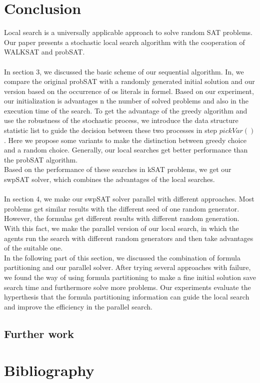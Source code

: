 \documentclass[12pt,a4paper,twoside]{scrartcl}
\numberwithin{equation}{section}
\begin{document}
\clearpage
\section{Conclusion}

\label{sec:conc}
Local search is a universally applicable approach to solve random SAT problems. Our paper presents a stochastic local search algorithm with the cooperation of WALKSAT and probSAT.\\
\\
In section 3, we discussed the basic scheme of our sequential algorithm. In, we compare the original probSAT with a randomly generated initial solution and our version based on the occurrence of os literals in formel. Based on our experiment, our initialization is advantages n the number of solved problems and also in the execution time of the search. To get the advantage of the greedy algorithm and use the robustness of the stochastic process, we introduce the data structure statistic list to guide the decision between these two processes in step $pickVar()$. Here we propose some variants to make the distinction between greedy choice and a random choice. Generally, our local searches get better performance than the probSAT algorithm. \\
Based on the performance of these searches in kSAT problems, we get our swpSAT solver, which combines the advantages of the local searches. \\
\\
In section 4, we make our swpSAT solver parallel with different approaches. Most problems get similar results with the different seed of one random generator. However, the formulas get different results with different random generation. With this fact, we make the parallel version of our local search, in which the agents run the search with different random generators and then take advantages of the suitable one.\\
In the following part of this section, we discussed the combination of formula partitioning and our parallel solver. After trying several approaches with failure, we found the way of using formula partitioning to make a fine initial solution save search time and furthermore solve more problems. Our experiments evaluate the hyperthesis that the formula partitioning information can guide the local search and improve the efficiency in the parallel search.
\subsection{Further work}
\clearpage
\section{Bibliography}


\end{document}
